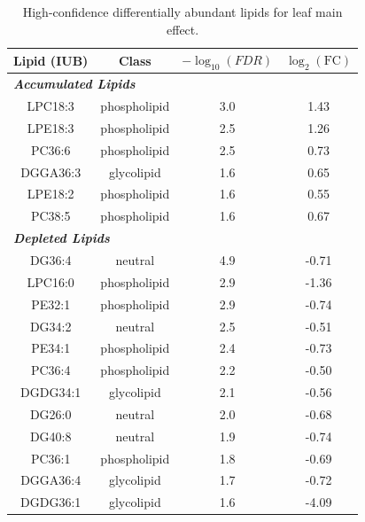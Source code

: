 \documentclass[9pt,twocolumn,twoside]{rilabRxiv}
\begin{document}
\clearpage

\begin{table}[h!]
\centering
\footnotesize
\caption{High-confidence differentially abundant lipids for leaf main effect.}
\label{table::leaf_lipids}
\begin{tabular}{cccc}
\hline
\textbf{Lipid (IUB)} & \textbf{Class} & \textbf{$-\log_{10}(\textit{FDR})$} & \textbf{$\log_2(\text{FC})$}\\
\hline
\multicolumn{4}{l}{\textit{\textbf{Accumulated Lipids}}} \\
\hline
LPC18:3 & phospholipid & 3.0 & 1.43\\
LPE18:3 & phospholipid & 2.5 & 1.26\\
PC36:6 & phospholipid & 2.5 & 0.73\\
DGGA36:3 & glycolipid & 1.6 & 0.65\\
LPE18:2 & phospholipid & 1.6 & 0.55\\
PC38:5 & phospholipid & 1.6 & 0.67\\
\hline
\multicolumn{4}{l}{\textit{\textbf{Depleted Lipids}}} \\
\hline
DG36:4 & neutral & 4.9 & -0.71\\
LPC16:0 & phospholipid & 2.9 & -1.36\\
PE32:1 & phospholipid & 2.9 & -0.74\\
DG34:2 & neutral & 2.5 & -0.51\\
PE34:1 & phospholipid & 2.4 & -0.73\\
PC36:4 & phospholipid & 2.2 & -0.50\\
DGDG34:1 & glycolipid & 2.1 & -0.56\\
DG26:0 & neutral & 2.0 & -0.68\\
DG40:8 & neutral & 1.9 & -0.74\\
PC36:1 & phospholipid & 1.8 & -0.69\\
DGGA36:4 & glycolipid & 1.7 & -0.72\\
DGDG36:1 & glycolipid & 1.6 & -4.09\\
\hline
\end{tabular}
\end{table}

\clearpage
\end{document}

